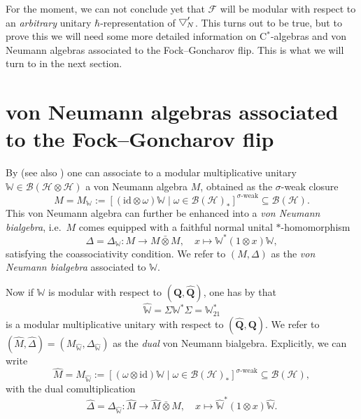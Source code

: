 \documentclass[11pt, reqno]{amsart}
\theoremstyle{definition}
\numberwithin{equation}{section}
\def\Hc{\mathcal H}
\newcommand{\Bc}{\mathcal{B}}
\newcommand{\Qb}{\mathbf{Q}}
\newcommand{\Fct}{\mathcal{F}}
\newcommand{\id}{\mathrm{id}}
\newcommand{\wbtd}[1]{\raisebox{\depth}{$\bigtriangledown'$\!\!}_{#1}}
\newcommand{\Wbb}{\mathbb{W}}
\begin{document}
For the moment, we can not conclude yet that $\Fct$ will be modular with respect to an \emph{arbitrary} unitary $\hbar$-representation of $\wbtd{N}$. This turns out to be true, but to prove this we will need some more detailed information on C$^*$-algebras and von Neumann algebras associated to the Fock--Goncharov flip. This is what we will turn to in the next section. 

\section{von Neumann algebras associated to the Fock--Goncharov flip}\label{SecvNMUMod}

By \cite[Theorem 2.3]{SW01} (see also \cite[Theorem 5]{SW07}) one can associate to a modular multiplicative unitary $\Wbb \in \Bc(\Hc\otimes \Hc)$ a von Neumann algebra $M$, obtained as the $\sigma$-weak closure 
\begin{equation}\label{EqFormvN}
M = M_{\Wbb} := [(\id\otimes \omega)\Wbb\mid \omega\in \Bc(\Hc)_*]^{\sigma\textrm{-weak}} \subseteq \Bc(\Hc).
\end{equation}
This von Neumann algebra can further be enhanced into a \emph{von Neumann bialgebra}, i.e.\ $M$ comes equipped with a faithful normal unital $*$-homomorphism
\begin{equation}\label{EqComultiplication}
\Delta = \Delta_{\Wbb}\colon M \rightarrow M \bar{\otimes} M,\quad x \mapsto \Wbb^*(1\otimes x)\Wbb,
\end{equation}
satisfying the coassociativity condition. We refer to $(M,\Delta)$ as the  \emph{von Neumann bialgebra} associated to $\Wbb$. 

Now if $\Wbb$ is modular with respect to $(\Qb,\hat{\Qb})$, one has by \cite[Proposition 2.2]{SW01} that 
\[
\hat{\Wbb} = \Sigma \Wbb^* \Sigma = \Wbb_{21}^*
\]
is a modular multiplicative unitary with respect to $(\hat{\Qb},\Qb)$. 
We refer to $(\hat{M},\hat{\Delta}) = (M_{\hat{\Wbb}},\Delta_{\hat{\Wbb}})$ as the \emph{dual} von Neumann bialgebra. Explicitly, we can write 
\begin{equation}\label{EqFormvNDual}
\hat{M} = M_{\hat{\Wbb}} := [(\omega\otimes \id)\Wbb\mid \omega\in \Bc(\Hc)_*]^{\sigma\textrm{-weak}} \subseteq \Bc(\Hc),
\end{equation}
with the dual comultiplication
\begin{equation}\label{EqComultiplicationDual}
\hat{\Delta} = \Delta_{\hat{\Wbb}}\colon \hat{M} \rightarrow \hat{M} \bar{\otimes} \hat{M},\quad x \mapsto \hat{\Wbb}^*(1\otimes x)\hat{\Wbb}.
\end{equation}
\end{document}
